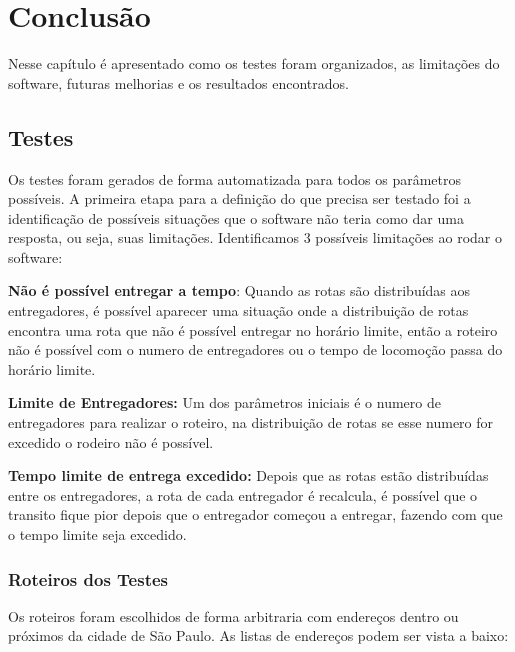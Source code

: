 \chapter{Conclusão}
Nesse capítulo é apresentado como os testes foram organizados, as limitações do software, futuras melhorias e os resultados encontrados.

\section{Testes}
Os testes foram gerados de forma automatizada para todos os parâmetros possíveis. A primeira etapa para a definição do que precisa ser testado foi a identificação de possíveis situações que o software não teria como dar uma resposta, ou seja, suas limitações. Identificamos 3 possíveis limitações ao rodar o software:  

\textbf{Não é possível entregar a tempo}: Quando as rotas são distribuídas aos entregadores, é possível aparecer uma situação onde a distribuição de rotas encontra uma rota que não é possível entregar no horário limite, então a roteiro não é possível com o numero de entregadores ou o tempo de locomoção passa do horário limite.

\textbf{Limite de Entregadores:} Um dos parâmetros iniciais é o numero de entregadores para realizar o roteiro, na distribuição de rotas se esse numero for excedido o rodeiro não é possível.

\textbf{Tempo limite de entrega excedido:} Depois que as rotas estão distribuídas entre os entregadores, a rota de cada entregador é recalcula, é possível que o transito fique pior depois que o entregador começou a entregar, fazendo com que o tempo limite seja excedido.

\subsection{Roteiros dos Testes}
Os roteiros foram escolhidos de forma arbitraria com endereços dentro ou próximos da cidade de São Paulo. As listas de endereços podem ser vista a baixo:

